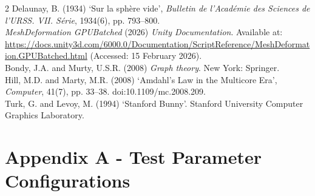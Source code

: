 \documentclass[]{article}
\begin{document}
\begin{multicols}{2}
Delaunay, B. (1934) `Sur la sphère vide', \emph{Bulletin de l'Académie des Sciences de l'URSS. VII. Série}, 1934(6), pp. 793--800.\medskip\\
\emph{MeshDeformation GPUBatched} (2026) \emph{Unity Documentation}. Available at: \url{https://docs.unity3d.com/6000.0/Documentation/ScriptReference/MeshDeformation.GPUBatched.html} (Accessed: 15 February 2026).\medskip\\
Bondy, J.A. and Murty, U.S.R. (2008) \emph{Graph theory}. New York: Springer.\medskip\\
Hill, M.D. and Marty, M.R. (2008) `Amdahl's Law in the Multicore Era', \emph{Computer}, 41(7), pp. 33--38. doi:10.1109/mc.2008.209.\medskip\\
Turk, G. and Levoy, M. (1994) `Stanford Bunny'. Stanford University Computer Graphics Laboratory.\medskip\\

\end{multicols}

\pagebreak

\section{Appendix A - Test Parameter Configurations}\label{appendix-a}
\end{document}
